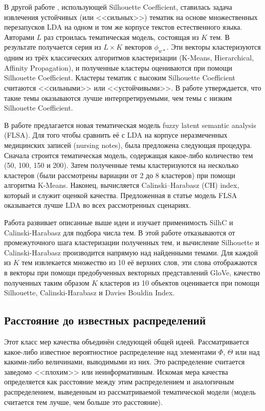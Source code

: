 В другой работе \cite{mehta_clustering_bank}, использующей Silhouette Coefficient, ставилась задача извлечения устойчивых (или <<сильных>>) тематик на основе множественных перезапусков LDA на одном и том же корпусе текстов естественного языка. Авторами $L$ раз строилась тематическая модель, состоящая из $K$ тем. В результате получается серия из $L \times K$ векторов $\phi_{w \ast}$. Эти векторы кластеризуются одним из трёх классических алгоритмов кластеризации (K-Means, Hierarchical, Affinity Propagation), и полученные кластеры оцениваются при помощи Silhouette Coefficient. Кластеры тематик с высоким Silhouette Coefficient считаются <<сильными>> или <<устойчивыми>>. В работе утверждается, что такие темы оказываются лучше интерпретируемыми, чем темы с низким Silhouette Coefficient.

В работе \cite{karami2018fuzzy} предлагается новая тематическая модель fuzzy latent semantic analysis (FLSA). Для того чтобы сравнить её с LDA на корпусе неразмеченных медицинских записей (nursing notes), была предложена следующая процедура. Сначала строится тематическая модель, содержащая какое-либо количество тем (50, 100, 150 и 200). Затем полученные темы кластеризуются на несколько кластеров (были рассмотрены вариации от 2 до 8 кластеров) при помощи алгоритма K-Means. Наконец, вычисляется Calinski–Harabasz (CH) index, который и служит оценкой качества. Предложенная в статье модель FLSA оказывается лучше LDA во всех рассмотренных сценариях.

Работа \cite{krasnov19clustering} развивает описанные выше идеи и изучает применимость SilhC и Calinski-Harabasz для подбора числа тем. В этой работе отказываются от промежуточного шага кластеризации полученных тем, и вычисление Silhouette и Calinski-Harabasz производится напрямую над найденными темами. Для каждой из $K$ тем извлекается множество из 10 её верхних слов, эти слова отображаются в векторы при помощи предобученных векторных представлений GloVe, качество полученных таким образом $K$ кластеров из 10 объектов оценивается при помощи Silhouette, Calinski-Harabasz и Davies Bouldin Index.

\subsection{Расстояние до известных распределений}

Этот класс мер качества объединён следующей общей идеей. Рассматривается какое-либо известное вероятностное распределение над элементами $\Phi$, $\Theta$ или над какими-либо величинами, выводимыми из них. Это распределение считается заведомо <<плохим>> или неинформативным. Искомая мера качества определяется как расстояние между этим распределением и аналогичным распределением, выведенным из рассматриваемой тематической модели (модель считается тем лучше, чем больше это расстояние).

